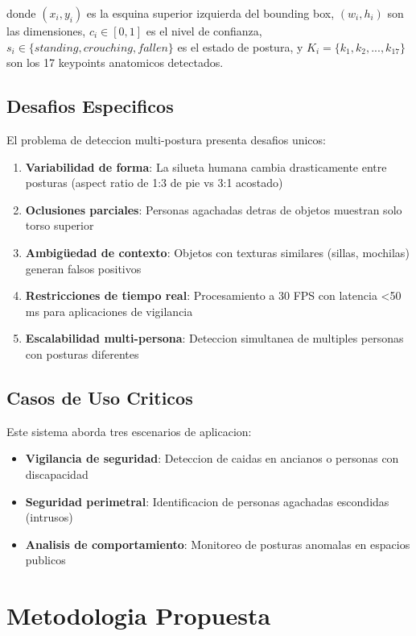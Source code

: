 \documentclass[conference]{IEEEtran}
\begin{document}
donde $(x_i, y_i)$ es la esquina superior izquierda del bounding box, $(w_i, h_i)$ son las dimensiones, $c_i \in [0,1]$ es el nivel de confianza, $s_i \in \{standing, crouching, fallen\}$ es el estado de postura, y $K_i = \{k_1, k_2, ..., k_{17}\}$ son los 17 keypoints anatomicos detectados.

\subsection{Desafios Especificos}

El problema de deteccion multi-postura presenta desafios unicos:

\begin{enumerate}
    \item \textbf{Variabilidad de forma}: La silueta humana cambia drasticamente entre posturas (aspect ratio de 1:3 de pie vs 3:1 acostado)
    \item \textbf{Oclusiones parciales}: Personas agachadas detras de objetos muestran solo torso superior
    \item \textbf{Ambigüedad de contexto}: Objetos con texturas similares (sillas, mochilas) generan falsos positivos
    \item \textbf{Restricciones de tiempo real}: Procesamiento a 30 FPS con latencia <50 ms para aplicaciones de vigilancia
    \item \textbf{Escalabilidad multi-persona}: Deteccion simultanea de multiples personas con posturas diferentes
\end{enumerate}

\subsection{Casos de Uso Criticos}

Este sistema aborda tres escenarios de aplicacion:

\begin{itemize}
    \item \textbf{Vigilancia de seguridad}: Deteccion de caidas en ancianos o personas con discapacidad
    \item \textbf{Seguridad perimetral}: Identificacion de personas agachadas escondidas (intrusos)
    \item \textbf{Analisis de comportamiento}: Monitoreo de posturas anomalas en espacios publicos
\end{itemize}

\section{Metodologia Propuesta}
\end{document}
